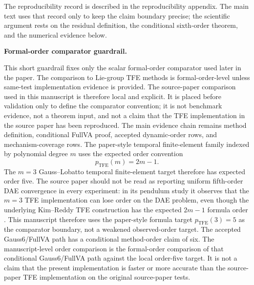 \documentclass[preprint,12pt]{elsarticle}
\newcommand{\method}{Gauss6\slash FullVA}
\newcommand{\tfe}{TFE}
\begin{document}
The reproducibility record is described in the reproducibility appendix. The
main text uses that record only to keep
the claim boundary precise; the scientific argument rests on the residual
definition, the conditional sixth-order theorem, and the numerical evidence below.

\noindent\textbf{Formal-order comparator guardrail.}

This short guardrail fixes only the scalar formal-order comparator used
later in the paper.  The comparison to Lie-group \tfe{} methods is
formal-order-level unless same-test implementation evidence is provided.  The
source-paper comparison used in this manuscript is therefore local and
explicit.  It is placed before validation only to define the comparator
convention; it is not benchmark evidence, not a theorem input, and
not a claim that the \tfe{} implementation in the source paper has been
reproduced.  The main evidence chain remains method definition, conditional
FullVA proof, accepted dynamic-order rows, and mechanism-coverage rows.
The paper-style temporal finite-element family indexed by polynomial degree $m$
uses the expected order convention
\begin{equation}
  p_{\mathrm{TFE}}(m)=2m-1 .
  \label{eq:tfe-order}
\end{equation}
The $m=3$ Gauss--Lobatto temporal finite-element target therefore has expected
order five. The source paper should not be read as reporting uniform fifth-order
DAE convergence in every experiment: in its pendulum study it observes that the
$m=3$ TFE implementation can lose order on the DAE problem, even though the
underlying Kim--Reddy TFE construction has the expected $2m-1$ formula order
\cite{kim2017higher,chaturvedi2026tfe}. This manuscript therefore uses the
paper-style formula target $p_{\mathrm{TFE}}(3)=5$ as the comparator boundary,
not a weakened observed-order target. The accepted \method{} path has a
conditional method-order claim of six. The manuscript-level order comparison
is the formal-order comparison of that conditional \method{} path against the
local order-five target. It is not a claim that the present implementation is
faster or more accurate than the source-paper \tfe{} implementation on the
original source-paper tests.
\end{document}
